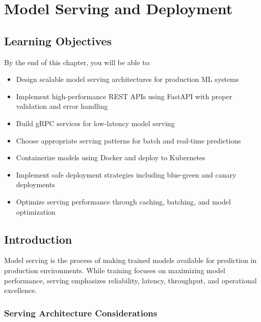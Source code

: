 \chapter{Model Serving and Deployment}
\label{ch:model_serving}

\section*{Learning Objectives}

By the end of this chapter, you will be able to:

\begin{itemize}
    \item Design scalable model serving architectures for production ML systems
    \item Implement high-performance REST APIs using FastAPI with proper validation and error handling
    \item Build gRPC services for low-latency model serving
    \item Choose appropriate serving patterns for batch and real-time predictions
    \item Containerize models using Docker and deploy to Kubernetes
    \item Implement safe deployment strategies including blue-green and canary deployments
    \item Optimize serving performance through caching, batching, and model optimization
\end{itemize}

\section{Introduction}

Model serving is the process of making trained models available for prediction in production environments. While training focuses on maximizing model performance, serving emphasizes reliability, latency, throughput, and operational excellence.

\subsection{Serving Architecture Considerations}


